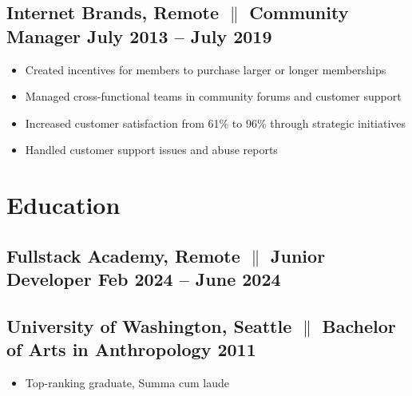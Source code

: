 \documentclass[a4paper,10pt]{article}
\begin{document}
\subsection{Internet Brands, Remote {$\parallel$}{ Community Manager} \hfill
      \textbf{July 2013 – July
            2019}}
\begin{itemize}
      \item Created incentives for members to purchase larger or longer memberships
      \item Managed cross-functional teams in community forums and customer support
      \item Increased customer satisfaction from 61\% to 96\% through strategic
            initiatives
      \item Handled customer support issues and abuse reports
\end{itemize}

\section{Education}
\subsection{Fullstack Academy, Remote {$\parallel$} {Junior Developer} \hfill
      \textbf{Feb
            2024 – June
            2024}}

\subsection{University of Washington, Seattle {$\parallel$}{ Bachelor of Arts
                  in Anthropology} \hfill
      \textbf{2011}}
\begin{itemize}
      \item Top-ranking graduate, Summa cum laude
\end{itemize}
\end{document}
